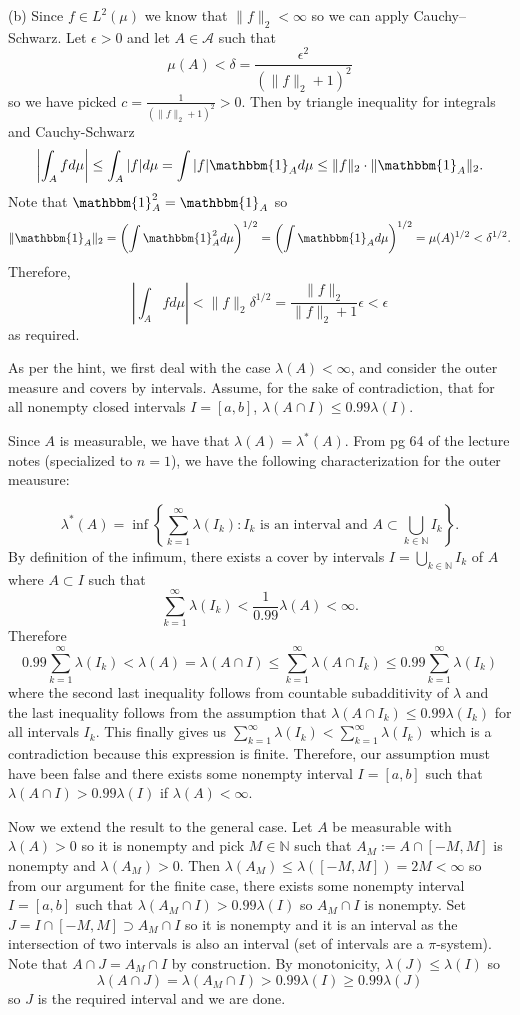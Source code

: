 \documentclass[12pt]{amsart} %
\def\N{\mathbb{N}}
\def\A{\mathcal{A}}
\def\1{\mathbbm{1}}
\begin{document}
\newpage
\noindent
(b) Since $f \in L^2(\mu)$ we know that $\|f\|_2 < \infty$ so we can apply Cauchy–Schwarz. Let $\epsilon > 0$ and let $A \in \A$ such that $$\mu(A) < \delta = \frac{\epsilon^2}{\left( \|f\|_2 + 1 \right)^2}$$ so we have picked $c = \frac{1}{\left( \|f\|_2 + 1 \right)^2} > 0.$ Then by triangle inequality for integrals and Cauchy-Schwarz$$
 \left| \int _A f d\mu \right| \le  \int_A |f| d\mu = \int |f| \1_A d\mu \le \|f\|_2 \cdot \|\1_A\|_2.
 $$ Note that $\1_A^2 = \1_A$ so $$\|\1_A\|_2 = \left(\int \1_A^2 d\mu \right)^{1/2} = \left(\int \1_A d\mu \right)^{1/2} = \mu(A)^{1/2} < \delta^{1/2}.$$ Therefore, $$
 \left| \int _A f d\mu \right| < \|f\|_2 \delta^{1/2} = \frac{\|f\|_2}{\|f\|_2 + 1}\epsilon < \epsilon
 $$ as required. 

\newpage
{} As per the hint, we first deal with the case $\lambda(A)<\infty$, and consider the outer measure and covers by intervals. Assume, for the sake of contradiction, that for all nonempty closed intervals $I = [a,b]$,  $\lambda(A\cap I) \le 0.99 \lambda(I).$ 


Since $A$ is measurable, we have that  $\lambda(A) = \lambda^*(A).$ From pg 64 of the lecture notes (specialized to $n=1$), we have the following characterization for the outer meausure: 

$$\lambda^*(A) = \inf\left\{\sum_{k=1}^{\infty}\lambda(I_k): I_k \text{ is an interval and } A \subset \bigcup_{k \in \N} I_k\right\}.$$ By definition of the infimum, there exists a cover by intervals $I = \bigcup_{k \in \N}I_k$ of $A$ where $A \subset I$ such that  $$\sum_{k =1}^{\infty} \lambda(I_k) < \frac{1}{0.99} \lambda(A) < \infty.$$ Therefore $$
0.99 \sum_{k=1}^{\infty}\lambda(I_k) < \lambda(A) = \lambda(A \cap I) \le \sum_{k=1}^{\infty} \lambda(A \cap I_k) \le 0.99 \sum_{k=1}^{\infty} \lambda(I_k)$$ where the second last inequality follows from countable subadditivity of $\lambda$ and the last inequality follows from the assumption that $\lambda(A \cap I_k) \le 0.99 \lambda(I_k)$ for all intervals $I_k$. This finally gives us $\sum_{k=1}^{\infty}\lambda(I_k) <  \sum_{k=1}^{\infty}\lambda(I_k)$ which is a contradiction because this expression is finite. Therefore, our assumption must have been false and there exists some nonempty interval $I = [a,b]$ such that $\lambda(A \cap I) > 0.99\lambda(I)$ if $\lambda(A) < \infty.$

Now we extend the result to the general case. Let $A$ be measurable with $\lambda(A) > 0$ so it is nonempty and pick $M \in \N$ such that $A_M := A \cap [-M, M]$ is nonempty and $\lambda(A_M) > 0$. Then $\lambda(A_M) \le \lambda\left( [-M,M] \right) = 2M < \infty$ so from our argument for the finite case, there exists some nonempty interval $I = [a,b]$ such that  $\lambda(A_M \cap I)  > 0.99 \lambda(I)$ so $A_M \cap I$ is nonempty. Set  $J = I \cap [-M,M] \supset A_M \cap I$ so it is nonempty and it is an interval as the intersection of two intervals is also an interval (set of intervals are a $\pi$-system). Note that $A \cap J = A_M \cap I$ by construction. By monotonicity, $\lambda(J) \le \lambda(I)$ so $$\lambda(A \cap J) = \lambda(A_M \cap I) > 0.99\lambda(I) \ge  0.99 \lambda(J)$$ so $J$ is the required interval and we are done. 
\end{document}
